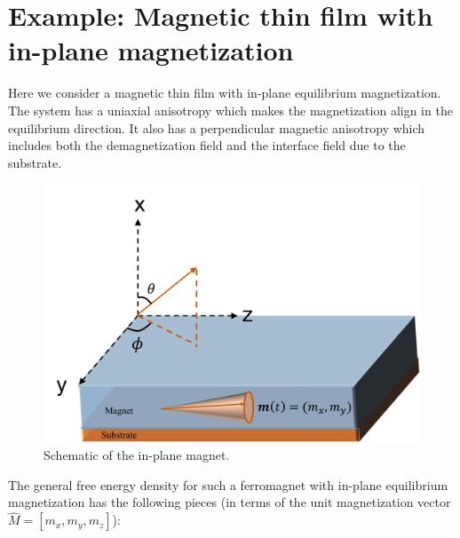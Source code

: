 \documentclass[aps,prb,onecolumn,notitlepage,showpacs,floatfix,superscriptaddress]{revtex4-1}
\begin{document}
\section{Example: Magnetic thin film with in-plane magnetization}
Here we consider a magnetic thin film with in-plane equilibrium magnetization. The system has a uniaxial anisotropy which makes the magnetization align in the equilibrium direction. It also has a perpendicular magnetic anisotropy which includes both the demagnetization field and the interface field due to the substrate.
\begin{figure}[hbtp]
\centering
\includegraphics[scale=0.4]{FMR_InPlaneMagnet.png}
\caption{Schematic of the in-plane magnet.}
\end{figure}
The general free energy density for such a ferromagnet with in-plane equilibrium magnetization has the following pieces (in terms of the unit magnetization vector $\hat{M}=[m_x,m_y,m_z]$):
\end{document}
